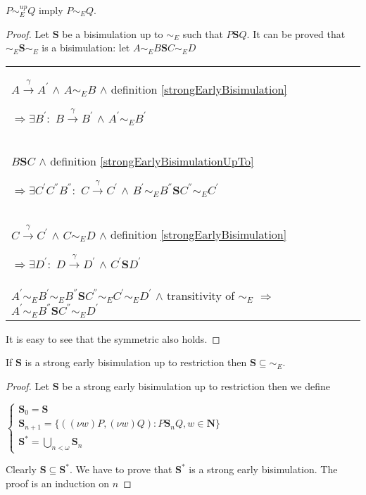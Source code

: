 \begin{proposition}\label{earlyBisimilarityUpToImplyEarlyBisimilarity}
  $P \sim_{E}^{up} Q$ imply $P \sim_{E} Q$.
  \begin{proof}
    Let $\mathbf{S}$ be a bisimulation up to $\sim_{E}$ such that $P \mathbf{S} Q$. It can be proved that $\sim_{E} \mathbf{S} \sim_{E}$ is a bisimulation: let $A \sim_{E} B \mathbf{S} C \sim_{E} D$
    \begin{center}
      \begin{tabular}{l}
	$A \xrightarrow{\gamma} A^{'}$ $\wedge$ $A \sim_{E} B$ $\wedge$ definition \ref{strongEarlyBisimulation} 
      
	$\Rightarrow \exists B^{'}:$ $B \xrightarrow{\gamma} B^{'}$ $\wedge$ $A^{'}\sim_{E} B^{'}$
      \\
	$B \mathbf{S} C$ $\wedge$ definition \ref{strongEarlyBisimulationUpTo}
      
	$\Rightarrow \exists C^{'} C^{''} B^{''}:$ $C \xrightarrow{\gamma} C^{'}$ $\wedge$ $B^{'} \sim_{E} B^{''} \mathbf{S} C^{''} \sim_{E} C^{'}$
      \\
	$C \xrightarrow{\gamma} C^{'}$ $\wedge$ $C \sim_{E} D$ $\wedge$ definition \ref{strongEarlyBisimulation} 
      
	$\Rightarrow \exists D^{'}:$ $D \xrightarrow{\gamma} D^{'}$ $\wedge$ $C^{'}\mathbf{S} D^{'}$
      \\
	$A^{'} \sim_{E} B^{'} \sim_{E} B^{''} \mathbf{S} C^{''} \sim_{E} C^{'} \sim_{E} D^{'}$ $\wedge$ transitivity of $\sim_{E}$
	$\Rightarrow$ $A^{'} \sim_{E} B^{''} \mathbf{S} C^{''} \sim_{E} D^{'}$
      \end{tabular}
    \end{center}
    It is easy to see that the symmetric also holds.
  \end{proof}
\end{proposition}

\begin{proposition}
  If $\mathbf{S}$ is a strong early bisimulation up to restriction then $\mathbf{S} \subseteq \sim_{E}$.
  \begin{proof}
    Let $\mathbf{S}$ be a strong early bisimulation up to restriction then we define
    \begin{center}
      $\left\{\begin{array}{l}
	  \mathbf{S}_{0} = \mathbf{S}
	\\
	  \mathbf{S}_{n+1}=\{((\nu w)P, (\nu w)Q): P\mathbf{S}_{n}Q, w\in \mathbf{N}\}
	\\
	  \mathbf{S}^{*}= \bigcup_{n<\omega} \mathbf{S}_{n}
       \end{array}\right.$
    \end{center}
    Clearly $\mathbf{S} \subseteq \mathbf{S}^{*}$. We have to prove that $\mathbf{S}^{*}$ is a strong early bisimulation. The proof is an induction on $n$
  \end{proof}
\end{proposition}


